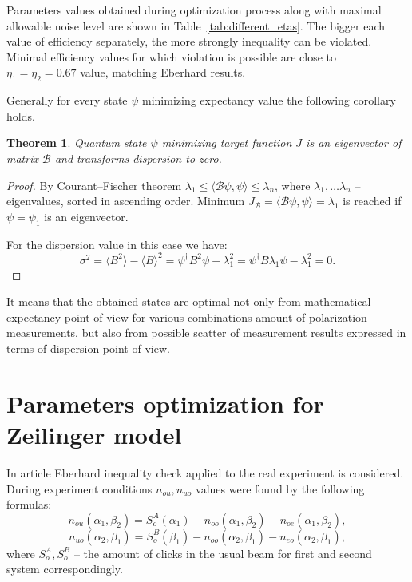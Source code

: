 \documentclass[11pt]{article}
\newtheorem{theorem}{Theorem}[section]
\begin{document}
\endgroup

Parameters values obtained during optimization process along with maximal allowable noise level 
are shown in Table~\ref{tab:different_etas}. The bigger each value of efficiency separately, the more 
strongly inequality can be violated. Minimal efficiency values for which violation is possible are close 
to  $\eta_1 = \eta_2 = 0.67$ value, matching Eberhard results.


Generally for every state $\psi$ minimizing expectancy value the following corollary holds.

\begin{theorem}
Quantum state $\psi$ minimizing target function $J$ is an eigenvector of matrix $\mathcal{B}$ and 
transforms dispersion to zero.
\end{theorem}
\begin{proof}
By Courant–Fischer theorem $\lambda_1 \leq \langle\mathcal{B}\psi, \psi\rangle \leq \lambda_n$, where $\lambda_1, \ldots \lambda_n$ -- eigenvalues, sorted in ascending order. Minimum 
$J_\mathcal{B} = \langle\mathcal{B}\psi, \psi\rangle = \lambda_1$ is reached if $\psi = \psi_1$ is an 
eigenvector.

For the dispersion value in this case we have:
\[\sigma^2 = \langle B^2\rangle - \langle B\rangle^2 = \psi^\dagger B^2 \psi - \lambda_1^2 = \psi^\dagger B \lambda_1  \psi - \lambda_1^2 = 0.
\]
\end{proof}

It means that the obtained states are optimal not only from mathematical expectancy point of view 
for various combinations amount of polarization measurements, but also from 
possible scatter of measurement results expressed in terms of dispersion point of view.

\section{Parameters optimization for Zeilinger model}
In article \cite{Zeilinger} Eberhard inequality check applied to the real experiment is considered. 
During experiment conditions $n_{ou}, n_{uo}$ values were found by the following formulas:
\[
n_{ou}(\alpha_1, \beta_2) = S_o^A(\alpha_1) - n_{oo}(\alpha_1, \beta_2) - n_{oe}(\alpha_1, \beta_2),
\]
\[
n_{uo}(\alpha_2, \beta_1) = S_o^B(\beta_1) - n_{oo}(\alpha_2, \beta_1) - n_{eo}(\alpha_2, \beta_1),
\]
where $S_o^A, S_o^B$ -- the amount of clicks in the usual beam for first and second system 
correspondingly.
\end{document}
